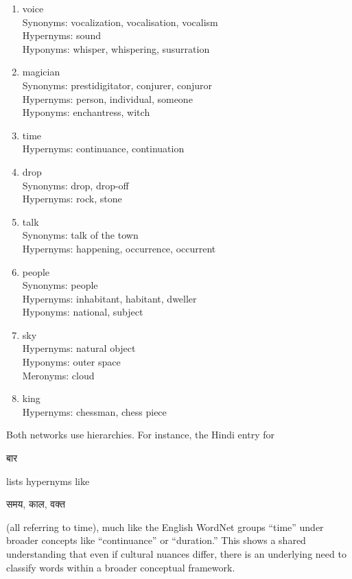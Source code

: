 \documentclass{article}
\begin{document}
\begin{enumerate}
\item voice \\
Synonyms:  vocalization,  vocalisation,  vocalism \\
Hypernyms: sound \\
Hyponyms: whisper,  whispering,  susurration

\item magician \\
Synonyms:  prestidigitator,  conjurer,  conjuror \\
Hypernyms: person,  individual,  someone \\
Hyponyms: enchantress,  witch

\item time \\
Hypernyms: continuance,  continuation

\item drop \\
Synonyms:  drop,  drop-off \\
Hypernyms: rock,  stone

\item talk \\
Synonyms:  talk of the town \\
Hypernyms: happening,  occurrence,  occurrent

\item people \\
Synonyms:  people \\
Hypernyms: inhabitant,  habitant,  dweller \\
Hyponyms: national,  subject

\item sky \\
Hypernyms: natural object \\
Hyponyms: outer space \\
Meronyms: cloud

\item king \\
Hypernyms: chessman,  chess piece 
\end{enumerate}

Both networks use hierarchies. For instance, the Hindi entry for \begin{hindi} बार \end{hindi} lists hypernyms like \begin{hindi} समय, काल, वक्त \end{hindi} (all referring to time), much like the English WordNet groups “time” under broader concepts like “continuance” or “duration.” This shows a shared understanding that even if cultural nuances differ, there is an underlying need to classify words within a broader conceptual framework.
\end{document}
